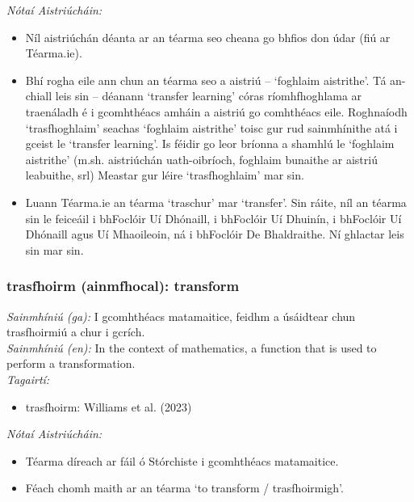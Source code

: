 \noindent \textit{Nótaí Aistriúcháin:}
\begin{itemize}
	\item Níl aistriúchán déanta ar an téarma seo cheana go bhfios don údar (fiú ar Téarma.ie).
	\item Bhí rogha eile ann chun an téarma seo a aistriú -- `foghlaim aistrithe'. Tá an-chiall leis sin -- déanann `transfer learning' córas ríomhfhoghlama ar traenáladh é i gcomhthéacs amháin a aistriú go comhthéacs eile. Roghnaíodh `trasfhoghlaim' seachas `foghlaim aistrithe' toisc gur rud sainmhínithe atá i gceist le `transfer learning'. Is féidir go leor bríonna a shamhlú le `foghlaim aistrithe' (m.sh. aistriúchán uath-oibríoch, foghlaim bunaithe ar aistriú leabuithe, srl) Meastar gur léire `trasfhoghlaim' mar sin.
	\item Luann Téarma.ie an téarma `traschur' mar `transfer'. Sin ráite, níl an téarma sin le feiceáil i bhFoclóir Uí Dhónaill, i bhFoclóir Uí Dhuinín, i bhFoclóir Uí Dhónaill agus Uí Mhaoileoin, ná i bhFoclóir De Bhaldraithe. Ní ghlactar leis sin mar sin.
\end{itemize}


\subsubsection*{trasfhoirm (ainmfhocal): transform}
 \noindent \textit{Sainmhíniú (ga):} I gcomhthéacs matamaitice, feidhm a úsáidtear chun trasfhoirmiú a chur i gcrích.
\\
 \noindent \textit{Sainmhíniú (en):} In the context of mathematics, a function that is used to perform a transformation.
\\
 \noindent \textit{Tagairtí:}
\begin{itemize}
	\item trasfhoirm: Williams et al. (2023) \cite{storchiste}
\end{itemize}

 \noindent \textit{Nótaí Aistriúcháin:}
\begin{itemize}
	\item Téarma díreach ar fáil ó Stórchiste i gcomhthéacs matamaitice.
	\item Féach chomh maith ar an téarma `to transform / trasfhoirmigh'.
\end{itemize}


